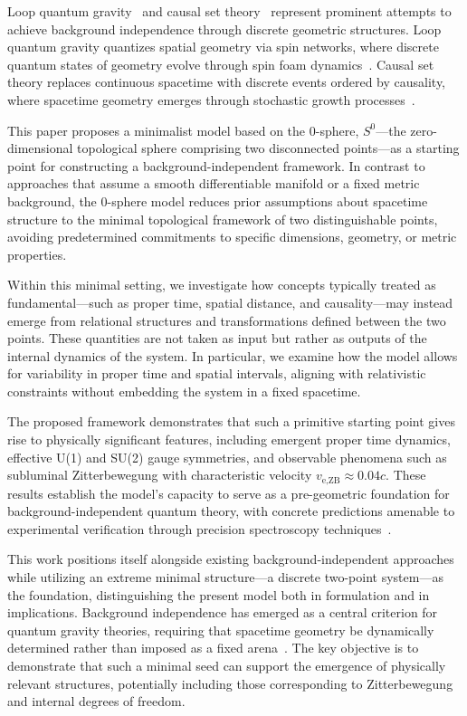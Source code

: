 \documentclass[%
 reprint,
 amsmath,amssymb,
 aps,
]{revtex4-1}
\numberwithin{equation}{section}%
\begin{document}
Loop quantum gravity~\cite{thiemann2007, rovelli2004} and causal set theory~\cite{surya2019, rideout2000} represent prominent attempts to achieve background independence through discrete geometric structures. Loop quantum gravity quantizes spatial geometry via spin networks, where discrete quantum states of geometry evolve through spin foam dynamics~\cite{rovelli1995}. Causal set theory replaces continuous spacetime with discrete events ordered by causality, where spacetime geometry emerges through stochastic growth processes~\cite{bombelli1987}.

This paper proposes a minimalist model based on the 0-sphere, $S^0$—the zero-dimensional topological sphere comprising two disconnected points—as a starting point for constructing a background-independent framework. In contrast to approaches that assume a smooth differentiable manifold or a fixed metric background, the 0-sphere model reduces prior assumptions about spacetime structure to the minimal topological framework of two distinguishable points, avoiding predetermined commitments to specific dimensions, geometry, or metric properties.

Within this minimal setting, we investigate how concepts typically treated as fundamental—such as proper time, spatial distance, and causality—may instead emerge from relational structures and transformations defined between the two points. These quantities are not taken as input but rather as outputs of the internal dynamics of the system. In particular, we examine how the model allows for variability in proper time and spatial intervals, aligning with relativistic constraints without embedding the system in a fixed spacetime.

The proposed framework demonstrates that such a primitive starting point gives rise to physically significant features, including emergent proper time dynamics, effective U(1) and SU(2) gauge symmetries, and observable phenomena such as subluminal Zitterbewegung with characteristic velocity $v_{\text{e,ZB}} \approx 0.04c$. These results establish the model's capacity to serve as a pre-geometric foundation for background-independent quantum theory, with concrete predictions amenable to experimental verification through precision spectroscopy techniques~\cite{fan2023}.

This work positions itself alongside existing background-independent approaches while utilizing an extreme minimal structure—a discrete two-point system—as the foundation, distinguishing the present model both in formulation and in implications. Background independence has emerged as a central criterion for quantum gravity theories, requiring that spacetime geometry be dynamically determined rather than imposed as a fixed arena~\cite{ashtekar2004}. The key objective is to demonstrate that such a minimal seed can support the emergence of physically relevant structures, potentially including those corresponding to Zitterbewegung and internal degrees of freedom.
\end{document}
